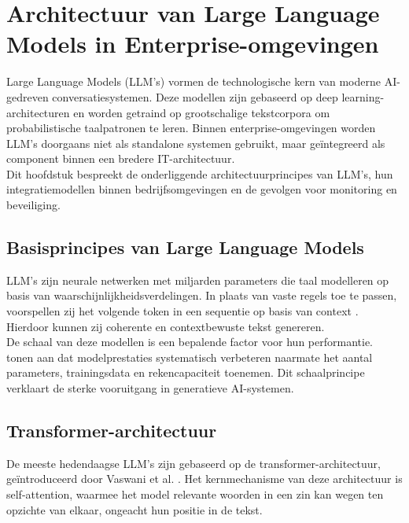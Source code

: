 \section{Architectuur van Large Language Models in Enterprise-omgevingen}

Large Language Models (LLM’s) vormen de technologische kern van moderne AI-gedreven conversatiesystemen. Deze modellen zijn gebaseerd op deep learning-architecturen en worden getraind op grootschalige tekstcorpora om probabilistische taalpatronen te leren. Binnen enterprise-omgevingen worden LLM’s doorgaans niet als standalone systemen gebruikt, maar geïntegreerd als component binnen een bredere IT-architectuur.\\

Dit hoofdstuk bespreekt de onderliggende architectuurprincipes van LLM’s, hun integratiemodellen binnen bedrijfsomgevingen en de gevolgen voor monitoring en beveiliging.

\subsection{Basisprincipes van Large Language Models}

LLM’s zijn neurale netwerken met miljarden parameters die taal modelleren op basis van waarschijnlijkheidsverdelingen. In plaats van vaste regels toe te passen, voorspellen zij het volgende token in een sequentie op basis van context \autocite{brown2020language}. Hierdoor kunnen zij coherente en contextbewuste tekst genereren.\\

De schaal van deze modellen is een bepalende factor voor hun performantie. \textcite{kaplan2020scaling} tonen aan dat modelprestaties systematisch verbeteren naarmate het aantal parameters, trainingsdata en rekencapaciteit toenemen. Dit schaalprincipe verklaart de sterke vooruitgang in generatieve AI-systemen.

\subsection{Transformer-architectuur}

De meeste hedendaagse LLM’s zijn gebaseerd op de transformer-architectuur, geïntroduceerd door Vaswani et al. \autocite{vaswani2017attention}. Het kernmechanisme van deze architectuur is self-attention, waarmee het model relevante woorden in een zin kan wegen ten opzichte van elkaar, ongeacht hun positie in de tekst.\\

